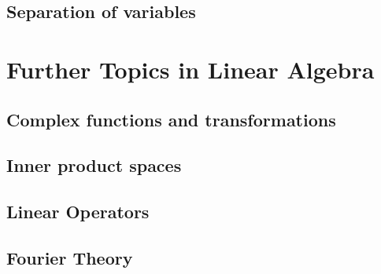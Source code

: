 \documentclass[12pt,letterpaper, openany, oneside]{book}
\begin{document}
\chapter{Separation of variables}


\part{Further Topics in Linear Algebra}



\chapter{Complex functions and transformations}
 

\chapter{Inner product spaces}


\chapter{Linear Operators}


\chapter{Fourier Theory}




%


 
\newenvironment{changemargin}[1]{%
\begin{list}{}{%
\setlength{\topsep}{#1}
\setlength{\listparindent}{\parindent}%
\setlength{\itemindent}{\parindent}%
\setlength{\parsep}{\parskip}%
}%
\item[]}{\end{list}}

\begin{changemargin}{0cm}
\printindex 
\end{changemargin}

 
\end{document}
